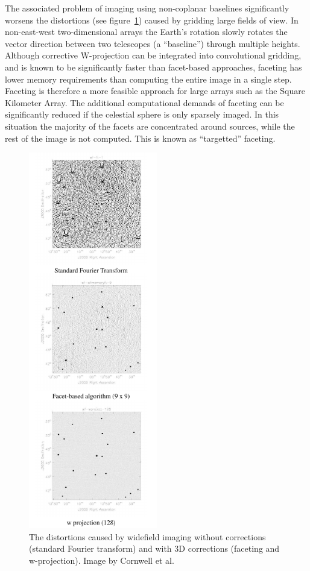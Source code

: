 \documentclass[a4paper, two column]{article}
\begin{document}
The associated problem of imaging using non-coplanar baselines significantly worsens the distortions (see figure~\ref{FIG_3D_DISTORTIONS}) caused by gridding large fields of view. In non-east-west two-dimensional arrays the 
Earth's rotation slowly rotates the vector direction between two telescopes (a ``baseline'') through multiple heights. Although corrective W-projection can be integrated into convolutional gridding, and is known to be significantly faster than facet-based approaches, faceting has lower memory requirements 
than computing the entire image in a single step. Faceting is therefore a more feasible approach for large arrays such as the Square Kilometer Array. The additional computational demands of faceting can be significantly reduced if the celestial sphere is only sparsely imaged. In this situation the majority
of the facets are concentrated around sources, while the rest of the image is not computed. This is known as ``targetted'' faceting.

\begin{figure}[h]
 \begin{mdframed}
 \centering
 \includegraphics[width=0.5\textwidth]{3d_correction.png}
 \caption{The distortions caused by widefield imaging without corrections (standard Fourier transform) and with 3D corrections (faceting and w-projection). Image by Cornwell et al. \cite{1416440}}
  \label{FIG_3D_DISTORTIONS}
 \end{mdframed}
\end{figure}
\end{document}
